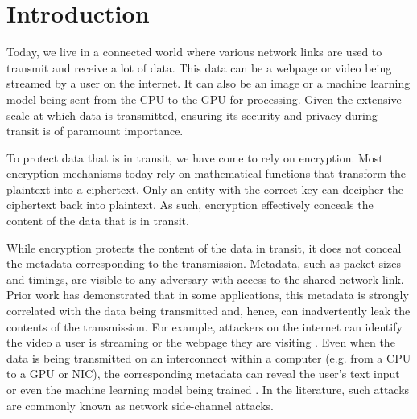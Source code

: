 
\chapter{Introduction}
\label{ch:Introduction}

Today, we live in a connected world where various network links are used to transmit and receive a lot of data. 
This data can be a webpage or video being streamed by a user on the internet. 
It can also be an image or a machine learning model being sent from the CPU to the GPU for processing. 
Given the extensive scale at which data is transmitted, ensuring its security and privacy during transit is of paramount importance.

To protect data that is in transit, we have come to rely on encryption. 
Most encryption mechanisms today rely on mathematical functions that transform the plaintext into a ciphertext. 
Only an entity with the correct key can decipher the ciphertext back into plaintext. 
As such, encryption effectively conceals the content of the data that is in transit.

While encryption protects the content of the data in transit, it does not conceal the metadata corresponding to the transmission.
Metadata, such as packet sizes and timings, are visible to any adversary with access to the shared network link.
Prior work has demonstrated that in some applications, this metadata is strongly correlated with the data being transmitted and, hence, can inadvertently leak the contents of the transmission.
For example, attackers on the internet can identify the video a user is streaming \cite{schuster2017beautyburst} or the webpage they are visiting \cite{gong2010fingerprinting, wang2014supersequence}.
Even when the data is being transmitted on an interconnect within a computer (e.g. from a CPU to a GPU or NIC), the corresponding metadata can reveal the user's text input or even the machine learning model being trained \cite{tan2021invisible}.
In the literature, such attacks are commonly known as network side-channel attacks.

